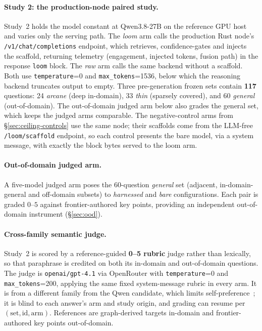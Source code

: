 \documentclass[10pt,twocolumn]{article}
\begin{document}
\paragraph{Study 2: the production-node paired study.} Study~2 holds the model constant at Qwen3.8-27B on the reference GPU host and varies only the serving path. The \emph{loom} arm calls the production Rust node's \texttt{/v1/chat/completions} endpoint, which retrieves, confidence-gates and injects the scaffold, returning telemetry (engagement, injected tokens, fusion path) in the response \texttt{loom} block. The \emph{raw} arm calls the same backend without a scaffold. Both use \texttt{temperature}=0 and \texttt{max\_tokens}=1536, below which the reasoning backend truncates output to empty. Three pre-generation frozen sets contain \textbf{117} questions: 24 \emph{arcane} (deep in-domain), 33 \emph{thin} (sparsely covered), and 60 \emph{general} (out-of-domain). The out-of-domain judged arm below also grades the general set, which keeps the judged arms comparable. The negative-control arms from \S\ref{sec:ceiling-controls} use the same node; their scaffolds come from the LLM-free \texttt{/loom/scaffold} endpoint, so each control presents the bare model, via a system message, with exactly the block bytes served to the loom arm.

\paragraph{Out-of-domain judged arm.} A five-model judged arm poses the 60-question \emph{general} set (adjacent, in-domain-general and off-domain subsets) to \emph{harnessed} and \emph{bare} configurations. Each pair is graded $0$--$5$ against frontier-authored key points, providing an independent out-of-domain instrument (\S\ref{sec:ood}).

\paragraph{Cross-family semantic judge.} Study~2 is scored by a reference-guided \textbf{0--5 rubric} judge rather than lexically, so that paraphrase is credited on both its in-domain and out-of-domain questions. The judge is \texttt{openai/gpt-4.1} via OpenRouter with \texttt{temperature}=0 and \texttt{max\_tokens}=200, applying the same fixed system-message rubric in every arm. It is from a different family from the Qwen candidate, which limits self-preference~\cite{zheng2023judging,panickssery2024selfpreference}; it is blind to each answer's arm and study origin, and grading can resume per $(\text{set},\text{id},\text{arm})$. References are graph-derived targets in-domain and frontier-authored key points out-of-domain.
\end{document}
